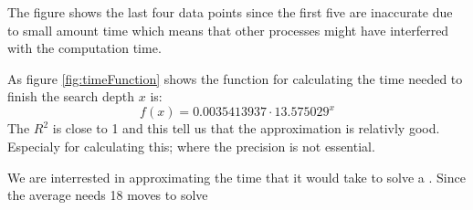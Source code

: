 The figure shows the last four data points since the first five are inaccurate due to small amount time which means that other processes might have interferred with the computation time.

As figure \ref{fig:timeFunction} shows the function for calculating the time needed to finish the search depth $x$ is:
\[
f(x)=0.0035413937 \cdot 13.575029^x
\]
The $R^2$ is close to 1 and this tell us that the approximation is relativly good. Especialy for calculating this; where the precision is not essential.

We are interrested in approximating the time that it would take to solve a \rubik{}. Since the average \rubik{} needs 18 moves to solve \cite{kociemba09}